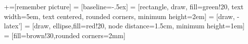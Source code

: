 \documentclass[12pt,aspectratio=169]{beamer}
\title[\normalfont{12th hackathon on software for the upgrade, Krak\'ow, 25 Jun 2018}]{\normalfont{Hackathon}}
\author[Maciej Szyma\'nski (UCAS)]{
  Maciej Szyma\'nski
}
\institute[UCAS]
{
  University of Chinese Academy of Sciences
}
\date[\today]{%
}
\begin{document}

+=[remember picture]
 = [baseline=-.5ex]
 = [rectangle, draw, fill=green!20, 
    text width=5em, text centered, rounded corners, minimum height=2em]
 = [draw, -latex']
 = [draw, ellipse,fill=red!20, node distance=1.5cm,
    minimum height=1em]
 = [fill=brown!30,rounded corners=2mm]



% 	
\end{document}
